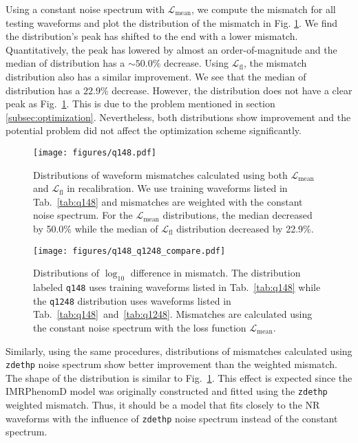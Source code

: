 \documentclass[twocolumn]{aastex631}
\newcommand{\zdethp}{\texttt{zdethp}}
\begin{document}
Using a constant noise spectrum with $\mathcal{L}_{\mathrm{mean}}$, we compute the mismatch for all testing waveforms and plot the distribution of the mismatch in Fig. \ref{fig:q148}. We find the distribution's peak has shifted to the end with a lower mismatch. Quantitatively, the peak has lowered by almost an order-of-magnitude and the median of distribution has a $\sim50.0\%$ decrease. Using $\mathcal{L}_{\mathrm{fl}}$, the mismatch distribution also has a similar improvement. We see that the median of distribution has a $22.9\%$ decrease. However, the distribution does not have a clear peak as Fig.~\ref{fig:q148}. This is due to the problem mentioned in section \ref{subsec:optimization}. Nevertheless, both distributions show improvement and the potential problem did not affect the optimization scheme significantly.  


\begin{figure}[t]
	\centering
	\texttt{[image: figures/q148.pdf]}
	\caption{Distributions of waveform mismatches calculated using both $\mathcal{L}_{\mathrm{mean}}$ and $\mathcal{L}_{\mathrm{fl}}$ in recalibration. We use training waveforms listed in Tab.~\ref{tab:q148} and mismatches are weighted with the constant noise spectrum. For the $\mathcal{L}_{\mathrm{mean}}$ distributions, the median decreased by 50.0\% while the median of $\mathcal{L}_{\mathrm{fl}}$ distribution decreased by 22.9\%.}
	\label{fig:q148}
\end{figure}
\begin{figure}[t]
	\centering
	\texttt{[image: figures/q148\_q1248\_compare.pdf]}
	\caption{Distributions of $\log_{10}$ difference in mismatch. The distribution labeled \texttt{q148} uses training waveforms listed in Tab.~\ref{tab:q148} while the \texttt{q1248} distribution uses waveforms listed in Tab.~\ref{tab:q148}~and~\ref{tab:q1248}. Mismatches are calculated using the constant noise spectrum with the loss function $\mathcal{L}_{\mathrm{mean}}$.}
	\label{fig:q148_q1248_compare}
\end{figure}

Similarly, using the same procedures, distributions of mismatches calculated using {\zdethp} noise spectrum show better improvement than the weighted mismatch. The shape of the distribution is similar to Fig.~\ref{fig:q148}. This effect is expected since the IMRPhenomD model was originally constructed and fitted using the {\zdethp} weighted mismatch. Thus, it should be a model that fits closely to the NR waveforms with the influence of {\zdethp} noise spectrum instead of the constant spectrum. 
\end{document}
